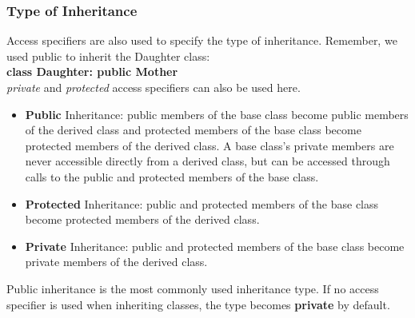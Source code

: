 \documentclass[12pt , a4paper]{article}
\newcommand{\hl}[1]{\colorbox{coolblack}{\color{cream}\textbf{#1}\color{black}}}
\begin{document}
	\subsubsection{Type of Inheritance}
	Access specifiers are also used to specify the type of inheritance.
	Remember, we used public to inherit the Daughter class:\\
	\hl{class Daughter: public Mother}\\[10pt]
	\textit{private} and \textit{protected} access specifiers can also be used here.\\
	\begin{itemize}
		\item \textbf{Public} Inheritance: public members of the base class become public members of the derived class and protected members of the base class become protected members of the derived class. A base class's private members are never accessible directly from a derived class, but can be accessed through calls to the public and protected members of the base class. \\
		\item \textbf{Protected} Inheritance: public and protected members of the base class become protected members of the derived class. \\
		\item \textbf{Private} Inheritance: public and protected members of the base class become private members of the derived class.
	\end{itemize}



	\begin{importantBox}
	Public inheritance is the most commonly used inheritance type. If no access specifier is used when inheriting classes, the type becomes \textbf{private} by default.
	\end{importantBox}
\end{document}
